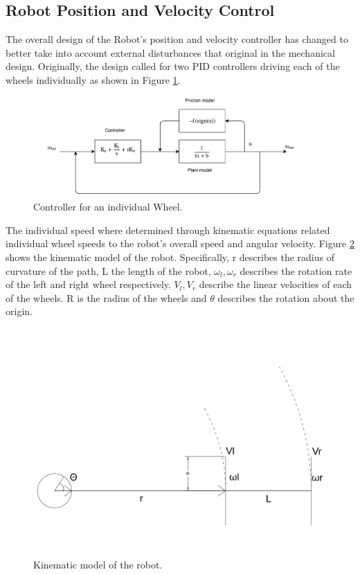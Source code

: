 \documentclass[ece]{uw-wkrpt}
\begin{document}
\subsection{Robot Position and Velocity Control}
The overall design of the Robot's position and velocity controller has changed to better take into account external disturbances that original in the mechanical design. Originally, the design called for two PID controllers driving each of the wheels individually as shown in Figure \ref{fig:singleWheelController}. 

\begin{figure}
    \centering
    \includegraphics[width=5.5in]{res/380ModelForWheel}
    \caption[Controller for an individual Wheel]
          {Controller for an individual Wheel.}
    \label{fig:singleWheelController}
\end{figure}

The individual speed where determined through kinematic equations related individual wheel speeds to the robot's overall speed and angular velocity. Figure \ref{fig:kinematicModel} shows the kinematic model of the robot. Specifically, r describes the radius of curvature of the path, L the length of the robot, $\omega_l, \omega_r$ describes the rotation rate of the left and right wheel respectively. $V_l, V_r$ describe the linear velocities of each of the wheels. R is the radius of the wheels and $\theta$ describes the rotation about the origin. 

\begin{figure}
    \centering
    \includegraphics[width=5.5in]{res/diagram}
    \caption[Kinematic model of the robot]
          {Kinematic model of the robot.}
    \label{fig:kinematicModel}
\end{figure}
\end{document}
